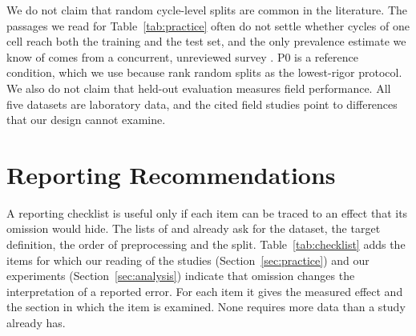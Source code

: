 \documentclass{ieeeaccess}
\begin{document}
We do not claim that random cycle-level splits are common in the literature. The passages we read for Table~\ref{tab:practice} often do not settle whether cycles of one cell reach both the training and the test set, and the only prevalence estimate we know of comes from a concurrent, unreviewed survey \cite{erdogan2026}. P0 is a reference condition, which we use because \cite{sohail2026} rank random splits as the lowest-rigor protocol. We also do not claim that held-out evaluation measures field performance. All five datasets are laboratory data, and the cited field studies \cite{pozzato2023,zhao2026} point to differences that our design cannot examine.

\section{Reporting Recommendations}
\label{sec:recs}
A reporting checklist is useful only if each item can be traced to an effect that its omission would hide. The lists of \cite{sohail2026} and \cite{rizanov2026} already ask for the dataset, the target definition, the order of preprocessing and the split. Table~\ref{tab:checklist} adds the items for which our reading of the studies (Section~\ref{sec:practice}) and our experiments (Section~\ref{sec:analysis}) indicate that omission changes the interpretation of a reported error. For each item it gives the measured effect and the section in which the item is examined. None requires more data than a study already has.
\end{document}
